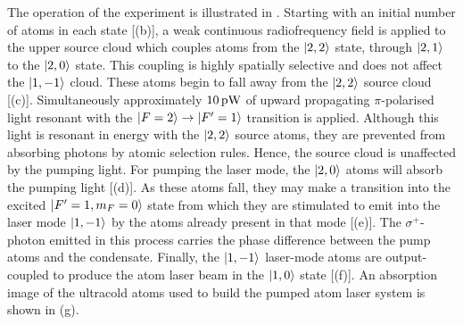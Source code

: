 The operation of the experiment is illustrated in .  Starting with an initial number of atoms in each state [(b)], a weak continuous radiofrequency field is applied to the upper source cloud which couples atoms from the ${\left|2, 2\right>}$ state, through ${\left|2, 1\right>}$ to the ${\left|2, 0\right>}$ state.  This coupling is highly spatially selective and does not affect the ${\left|1, -1\right>}$ cloud.  These atoms begin to fall away from the ${\left|2, 2\right>}$ source cloud [(c)].  Simultaneously approximately $\unit[10]{pW}$ of upward propagating $\pi$-polarised light resonant with the ${\left|F=2\right>}\rightarrow{\ensuremath{\left|F'=1\right>}}$ transition is applied.  Although this light is resonant in energy with the ${\left|2, 2\right>}$ source atoms, they are prevented from absorbing photons by atomic selection rules.  Hence, the source cloud is unaffected by the pumping light.  For pumping the laser mode, the ${\left|2, 0\right>}$ atoms will absorb the pumping light [(d)].  As these atoms fall, they may make a transition into the excited ${\left|F'=1, m_F=0\right>}$ state from which they are stimulated to emit into the laser mode ${\left|1, -1\right>}$ by the atoms already present in that mode [(e)].  The $\sigma^{+}$-photon emitted in this process carries the phase difference between the pump atoms and the condensate.  Finally, the ${\left|1, -1\right>}$ laser-mode atoms are output-coupled to produce the atom laser beam in the ${\left|1, 0\right>}$ state [(f)].  An absorption image of the ultracold atoms used to build the pumped atom laser system is shown in (g).

